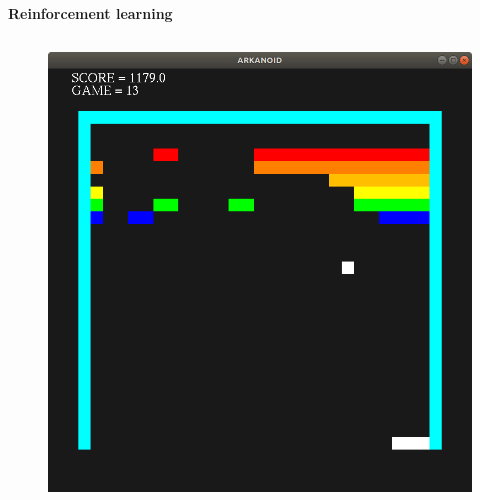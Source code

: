 \documentclass[xcolor=dvipsnames]{beamer}
\begin{document}
\begin{frame}{\bf Reinforcement learning}
\begin{columns}
\begin{column}{0.5\textwidth}
    \begin{figure}[!htb]
      \centering
      \includegraphics[scale=0.15]{../../diagrams/rl/arkanoid.png}
    \end{figure}

\end{column}
\end{columns}

\end{frame}
\end{document}
